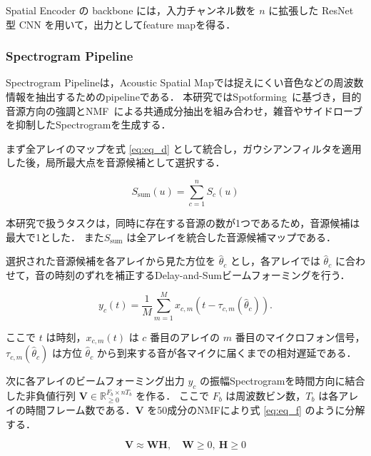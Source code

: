 \documentclass{article}
\begin{document}
	Spatial Encoder の backbone には，入力チャンネル数を $n$ に拡張した ResNet 型 CNN を用いて，出力としてfeature mapを得る．




\subsubsection{Spectrogram Pipeline}
\label{sec:spec}
	Spectrogram Pipelineは，Acoustic Spatial Mapでは捉えにくい音色などの周波数情報を抽出するためのpipelineである．
	本研究ではSpotforming~\citep{spotforming_nmf}に基づき，目的音源方向の強調とNMF~\citep{lee1999nmf}による共通成分抽出を組み合わせ，雑音やサイドローブを抑制したSpectrogramを生成する．

	まず全アレイのマップを式 \ref{eq:eq_d} として統合し，ガウシアンフィルタを適用した後，局所最大点を音源候補として選択する．
	
	\begin{equation}
	\label{eq:eq_d}
	S_{\mathrm{sum}}(u)=\sum_{c=1}^{n} S_c(u)
	\end{equation}

	本研究で扱うタスクは，同時に存在する音源の数が1つであるため，音源候補は最大で1とした．
	また$S_{\mathrm{sum}}$ は全アレイを統合した音源候補マップである．

	選択された音源候補を各アレイから見た方位を $\hat{\theta}_c$ とし，各アレイでは $\hat{\theta}_c$ に合わせて，音の時刻のずれを補正するDelay-and-Sumビームフォーミングを行う．
	
	\begin{equation}
	\label{eq:eq_e}
	y_c(t)=\frac{1}{M}\sum_{m=1}^{M}
	x_{c,m}(t-\tau_{c,m}(\hat{\theta}_c)).
	\end{equation}

	ここで $t$ は時刻，$x_{c,m}(t)$ は $c$ 番目のアレイの $m$ 番目のマイクロフォン信号，$\tau_{c,m}(\hat{\theta}_c)$ は方位 $\hat{\theta}_c$ から到来する音が各マイクに届くまでの相対遅延である．

	次に各アレイのビームフォーミング出力 $y_c$ の振幅Spectrogramを時間方向に結合した非負値行列 $\mathbf{V}\in\mathbb{R}_{\ge0}^{F_b\times nT_b}$ を作る．
	ここで $F_b$ は周波数ビン数，$T_b$ は各アレイの時間フレーム数である．$\mathbf{V}$ を50成分のNMFにより式 \ref{eq:eq_f} のように分解する．
	
	\begin{equation}
	\label{eq:eq_f}
	\mathbf{V}\approx \mathbf{W}\mathbf{H},\quad
	\mathbf{W}\ge0,\ \mathbf{H}\ge0
	\end{equation}
	
\end{document}
